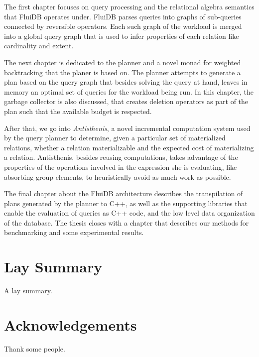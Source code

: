 \begin{precontent}
The first chapter focuses on query processing and the relational
algebra semantics that FluiDB operates under. FluiDB parses queries
into graphs of sub-queries connected by reversible operators. Each
such graph of the workload is merged into a global query graph that is
used to infer properties of each relation like cardinality and
extent.

The next chapter is dedicated to the planner and a novel monad for
weighted backtracking that the planer is based on. The planner
attempts to generate a plan based on the query graph that besides
solving the query at hand, leaves in memory an optimal set of queries
for the workload being run. In this chapter, the garbage collector is
also discussed, that creates deletion operators as part of the plan
such that the available budget is respected.

After that, we go into \emph{Antisthenis}, a novel incremental
computation system used by the query planner to determine, given a
particular set of materialized relations, whether a relation
materializable and the expected cost of materializing a
relation. Antisthenis, besides reusing computations, takes advantage
of the properties of the operations involved in the expression she is
evaluating, like absorbing group elements, to heuristically avoid as
much work as possible.

The final chapter about the FluiDB architecture describes the
transpilation of plans generated by the planner to C++, as well as the
supporting libraries that enable the evaluation of queries as C++
code, and the low level data organization of the database. The thesis
closes with a chapter that describes our methods for benchmarking and
some experimental results.


\chapter{Lay Summary}%
A lay summary.

\chapter{Acknowledgements}%
Thank some people.






\end{precontent}


\tableofcontents

\cleardoublepage
{}
{}
\listoffigures

\cleardoublepage%
